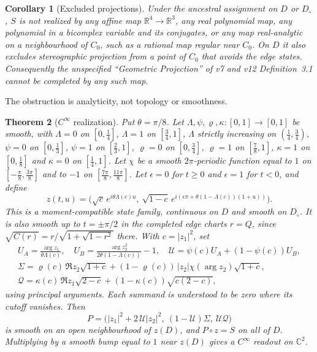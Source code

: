 \documentclass[11pt]{article}
\newtheorem{theorem}{Theorem}[section]
\newtheorem{corollary}[theorem]{Corollary}
\theoremstyle{definition}\newtheorem{definition}[theorem]{Definition}
\theoremstyle{remark}\newtheorem{remark}[theorem]{Remark}
\newcommand{\R}{\mathbb R}\newcommand{\C}{\mathbb C}\newcommand{\Z}{\mathbb Z}
\begin{document}
\begin{corollary}[Excluded projections]\label{cor:excluded}
Under the ancestral assignment on $D$ or $D_\circ$, $S$ is not realized by any
affine map $\R^4\to\R^3$, any real polynomial map, any polynomial in a
bicomplex variable and its conjugates, or any map real-analytic on a
neighbourhood of $C_0$, such as a rational map regular near $C_0$. On $D$ it
also excludes stereographic projection from a point of $C_0$ that avoids the
edge states.
Consequently the unspecified ``Geometric Projection'' of v7 and v12
Definition~3.1 cannot be completed by any such map.
\end{corollary}

The obstruction is analyticity, not topology or smoothness.

\begin{theorem}[$C^\infty$ realization]\label{thm:smooth}
Put $\theta=\pi/8$. Let $\Lambda,\psi,\varrho,\kappa:[0,1]\to[0,1]$ be smooth, with
$\Lambda=0$ on $[0,\frac14]$, $\Lambda=1$ on $[\frac34,1]$, $\Lambda$ strictly
increasing on $(\frac14,\frac34)$, $\psi=0$ on $[0,\frac13]$, $\psi=1$ on
$[\frac23,1]$, $\varrho=0$ on $[0,\frac34]$, $\varrho=1$ on $[\frac78,1]$,
$\kappa=1$ on $[0,\frac18]$ and $\kappa=0$ on $[\frac14,1]$. Let $\chi$ be a
smooth $2\pi$-periodic function equal to $1$ on $[-\frac\pi8,\frac{3\pi}8]$ and to
$-1$ on $[\frac{7\pi}8,\frac{11\pi}8]$. Let $\epsilon=0$ for $t\geq0$ and
$\epsilon=1$ for $t<0$, and define
\[
 z(t,u)=\bigl(\sqrt c\,e^{i\theta\Lambda(c)u},\
 \sqrt{1-c}\,e^{i(\epsilon\pi+\theta(1-\Lambda(c))(1+u))}\bigr).
\]
This is a moment-compatible state family, continuous on $D$ and smooth on
$D_\circ$. It is also smooth up to $t=\pm\pi/2$ in the completed edge charts
$r=Q$, since $\sqrt{C(r)}=r/\sqrt{1+\sqrt{1-r^2}}$ there. With $c=|z_1|^2$, set
\begin{gather*}
 U_A=\frac{\arg z_1}{\theta\Lambda(c)},\quad
 U_B=\frac{\arg z_2^2}{2\theta(1-\Lambda(c))}-1,\quad
 \mathcal U=\psi(c)U_A+(1-\psi(c))U_B,\\
 \Sigma=\varrho(c)\,\Re z_2\sqrt{1+c}+(1-\varrho(c))\,|z_2|\chi(\arg z_2)\sqrt{1+c},\\
 \mathcal Q=\kappa(c)\,\Re z_1\sqrt{2-c}+(1-\kappa(c))\sqrt{c(2-c)},
\end{gather*}
using principal arguments. Each summand is understood to be zero where its
cutoff vanishes. Then
\[
 P=\bigl(|z_1|^2+2\,\mathcal U|z_2|^2,\ (1-\mathcal U)\Sigma,\ \mathcal U\mathcal Q\bigr)
\]
is smooth on an open neighbourhood of $z(D)$, and $P\circ z=S$ on all of $D$.
Multiplying by a smooth bump equal to $1$ near $z(D)$ gives a $C^\infty$ readout
on $\C^2$.
\end{theorem}
\end{document}
